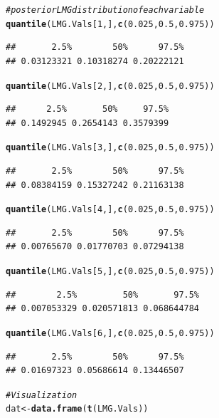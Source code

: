 \documentclass[11pt,a4paper,twoside]{book}\usepackage[]{graphicx}\usepackage[]{color}
\makeatletter
\newcommand{\hlnum}[1]{\textcolor[rgb]{0.686,0.059,0.569}{#1}}%
\newcommand{\hlcom}[1]{\textcolor[rgb]{0.678,0.584,0.686}{\textit{#1}}}%
\newcommand{\hlstd}[1]{\textcolor[rgb]{0.345,0.345,0.345}{#1}}%
\newcommand{\hlkwb}[1]{\textcolor[rgb]{0.69,0.353,0.396}{#1}}%
\newcommand{\hlkwd}[1]{\textcolor[rgb]{0.737,0.353,0.396}{\textbf{#1}}}%
\newenvironment{kframe}{%
 \def\at@end@of@kframe{}%
 \ifinner\ifhmode%
  \def\at@end@of@kframe{\end{minipage}}%
  \begin{minipage}{\columnwidth}%
 \fi\fi%
 \def\FrameCommand##1{\hskip\@totalleftmargin \hskip-\fboxsep
 \colorbox{shadecolor}{##1}\hskip-\fboxsep
     \hskip-\linewidth \hskip-\@totalleftmargin \hskip\columnwidth}%
 \MakeFramed {\advance\hsize-\width
   \@totalleftmargin\z@ \linewidth\hsize
   \@setminipage}}%
 {\par\unskip\endMakeFramed%
 \at@end@of@kframe}
\newenvironment{knitrout}{}{} %
\makeatother
\begin{document}
\begin{knitrout}
\begin{kframe}
\begin{alltt}
\hlcom{# posterior LMG distribution of each variable}
\hlkwd{quantile}\hlstd{(LMG.Vals[}\hlnum{1}\hlstd{,],} \hlkwd{c}\hlstd{(}\hlnum{0.025}\hlstd{,} \hlnum{0.5}\hlstd{,} \hlnum{0.975}\hlstd{))}
\end{alltt}
\begin{verbatim}
##       2.5%        50%      97.5% 
## 0.03123321 0.10318274 0.20222121
\end{verbatim}
\begin{alltt}
\hlkwd{quantile}\hlstd{(LMG.Vals[}\hlnum{2}\hlstd{,],} \hlkwd{c}\hlstd{(}\hlnum{0.025}\hlstd{,} \hlnum{0.5}\hlstd{,} \hlnum{0.975}\hlstd{))}
\end{alltt}
\begin{verbatim}
##      2.5%       50%     97.5% 
## 0.1492945 0.2654143 0.3579399
\end{verbatim}
\begin{alltt}
\hlkwd{quantile}\hlstd{(LMG.Vals[}\hlnum{3}\hlstd{,],} \hlkwd{c}\hlstd{(}\hlnum{0.025}\hlstd{,} \hlnum{0.5}\hlstd{,} \hlnum{0.975}\hlstd{))}
\end{alltt}
\begin{verbatim}
##       2.5%        50%      97.5% 
## 0.08384159 0.15327242 0.21163138
\end{verbatim}
\begin{alltt}
\hlkwd{quantile}\hlstd{(LMG.Vals[}\hlnum{4}\hlstd{,],} \hlkwd{c}\hlstd{(}\hlnum{0.025}\hlstd{,} \hlnum{0.5}\hlstd{,} \hlnum{0.975}\hlstd{))}
\end{alltt}
\begin{verbatim}
##       2.5%        50%      97.5% 
## 0.00765670 0.01770703 0.07294138
\end{verbatim}
\begin{alltt}
\hlkwd{quantile}\hlstd{(LMG.Vals[}\hlnum{5}\hlstd{,],} \hlkwd{c}\hlstd{(}\hlnum{0.025}\hlstd{,} \hlnum{0.5}\hlstd{,} \hlnum{0.975}\hlstd{))}
\end{alltt}
\begin{verbatim}
##        2.5%         50%       97.5% 
## 0.007053329 0.020571813 0.068644784
\end{verbatim}
\begin{alltt}
\hlkwd{quantile}\hlstd{(LMG.Vals[}\hlnum{6}\hlstd{,],} \hlkwd{c}\hlstd{(}\hlnum{0.025}\hlstd{,} \hlnum{0.5}\hlstd{,} \hlnum{0.975}\hlstd{))}
\end{alltt}
\begin{verbatim}
##       2.5%        50%      97.5% 
## 0.01697323 0.05686614 0.13446507
\end{verbatim}
\begin{alltt}
\hlcom{#Visualization}
\hlstd{dat} \hlkwb{<-} \hlkwd{data.frame}\hlstd{(}\hlkwd{t}\hlstd{(LMG.Vals))}


\end{alltt}
\end{kframe}
\end{knitrout}
\end{document}

